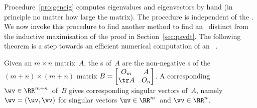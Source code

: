 Procedure~\ref{pro:geneig} computes eigenvalues and eigenvectors by hand (in principle no matter how large the matrix). 
The procedure is independent of the \svd.
We now invoke this procedure to find another method to find an \svd\ distinct from the inductive maximisation of the proof in Section~\ref{sec:psvdt}. 
The following theorem is a step towards an efficient numerical computation of an \svd\ \cite[p.234]{Trefethen1997}.



\begin{theorem} \label{thm:eigsvd}
Given an \(m\times n\) matrix~\(A\), the s of~\(A\) are the non-negative s of the \((m+n)\times(m+n)\) matrix \(B=\begin{bmatrix} O_m&A\\\tr A&O_n \end{bmatrix}\). 
A corresponding ~\(\wv\in\RR^{m+n}\)\ of~\(B\) gives corresponding  singular vectors of~\(A\), namely \(\wv=(\uv,\vv)\) for singular vectors \(\uv\in\RR^m\)\ and \(\vv\in\RR^n\). 
\end{theorem}

